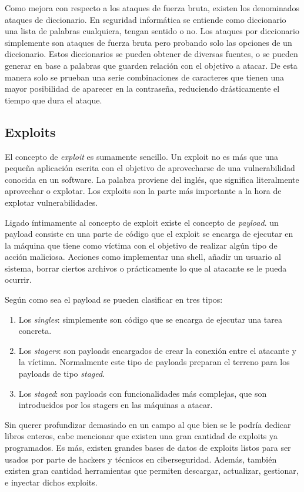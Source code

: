 Como mejora con respecto a los ataques de fuerza bruta, existen los denominados ataques de diccionario. En seguridad informática se entiende como diccionario una lista de palabras cualquiera, tengan sentido o no. Los ataques por diccionario simplemente son ataques de fuerza bruta pero probando solo las opciones de un diccionario. Estos diccionarios se pueden obtener de diversas fuentes, o se pueden generar en base a palabras que guarden relación con el objetivo a atacar. De esta manera solo se prueban una serie combinaciones de caracteres que tienen una mayor posibilidad de aparecer en la contraseña, reduciendo drásticamente el tiempo que dura el ataque.

\subsection{Exploits}

El concepto de \emph{exploit} es sumamente sencillo. Un exploit no es más que una pequeña aplicación escrita con el objetivo de aprovecharse de una vulnerabilidad conocida en un software. La palabra proviene del inglés, que significa literalmente aprovechar o explotar. Los exploits son la parte más importante a la hora de explotar vulnerabilidades.

Ligado íntimamente al concepto de exploit existe el concepto de \emph{payload}. un payload consiste en una parte de código que el exploit se encarga de ejecutar en la máquina que tiene como víctima con el objetivo de realizar algún tipo de acción maliciosa. Acciones como implementar una shell, añadir un usuario al sistema, borrar ciertos archivos o prácticamente lo que al atacante se le pueda ocurrir.

Según como sea el payload se pueden clasificar en tres tipos:
\begin{enumerate}
	\item Los \emph{singles}: simplemente son código que se encarga de ejecutar una tarea concreta.
	\item Los \emph{stagers}: son payloads encargados de crear la conexión entre el atacante y la víctima. Normalmente este tipo de payloads preparan el terreno para los payloads de tipo \textit{staged}.
	\item Los \emph{staged}: son payloads con funcionalidades más complejas, que son introducidos por los stagers en las máquinas a atacar.
\end{enumerate}

Sin querer profundizar demasiado en un campo al que bien se le podría dedicar libros enteros, cabe mencionar que existen una gran cantidad de exploits ya programados. Es más, existen grandes bases de datos de exploits listos para ser usados por parte de hackers y técnicos en ciberseguridad. Además, también existen gran cantidad herramientas que permiten descargar, actualizar, gestionar, e inyectar dichos exploits.

